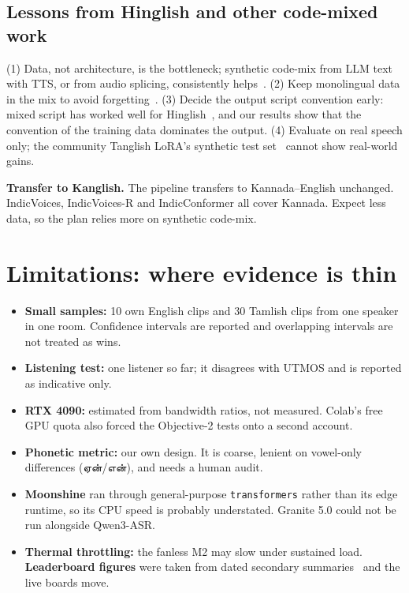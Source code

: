 \documentclass[conference]{IEEEtran}
\newcommand{\ta}[1]{#1}
\begin{document}
\subsection{Lessons from Hinglish and other code-mixed work}
(1) Data, not architecture, is the bottleneck; synthetic code-mix from LLM text with TTS, or from audio splicing, consistently helps~\cite{biswas2025hinglish,seacs2025}. (2) Keep monolingual data in the mix to avoid forgetting~\cite{shah2020cs}. (3) Decide the output script convention early: mixed script has worked well for Hinglish~\cite{mc_shunya}, and our results show that the convention of the training data dominates the output. (4) Evaluate on real speech only; the community Tanglish LoRA's synthetic test set~\cite{mc_tanglishlora} cannot show real-world gains.

\textbf{Transfer to Kanglish.} The pipeline transfers to Kannada--English unchanged. IndicVoices, IndicVoices-R and IndicConformer all cover Kannada. Expect less data, so the plan relies more on synthetic code-mix.

\section{Limitations: where evidence is thin}
\label{sec:limits}
\begin{itemize}
\item \textbf{Small samples:} 10 own English clips and 30 Tamlish clips from one speaker in one room. Confidence intervals are reported and overlapping intervals are not treated as wins.
\item \textbf{Listening test:} one listener so far; it disagrees with UTMOS and is reported as indicative only.
\item \textbf{RTX 4090:} estimated from bandwidth ratios, not measured. Colab's free GPU quota also forced the Objective-2 tests onto a second account.
\item \textbf{Phonetic metric:} our own design. It is coarse, lenient on vowel-only differences (\ta{ஏன்}/\ta{என்}), and needs a human audit.
\item \textbf{Moonshine} ran through general-purpose \texttt{transformers} rather than its edge runtime, so its CPU speed is probably understated. Granite 5.0 could not be run alongside Qwen3-ASR.
\item \textbf{Thermal throttling:} the fanless M2 may slow under sustained load. \textbf{Leaderboard figures} were taken from dated secondary summaries~\cite{pinggystt,pinggytts} and the live boards move.
\end{itemize}
\end{document}
